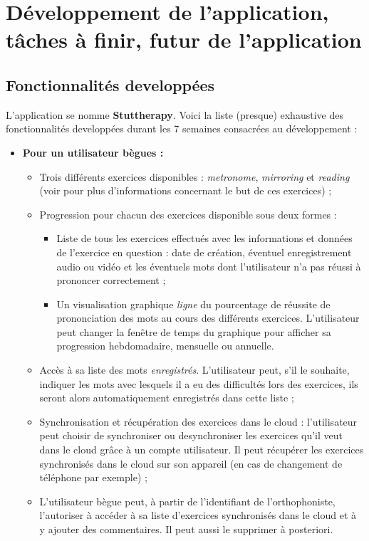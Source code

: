 \section{Développement de l'application, tâches à finir, futur de l'application}

\subsection{Fonctionnalités developpées}
L'application se nomme \textbf{Stuttherapy}. Voici la liste (presque) exhaustive des fonctionnalités developpées durant les 7 semaines consacrées au développement :

\begin{itemize}

  \item \textbf{Pour un utilisateur bègues :}
  \begin{itemize}
    \item Trois différents exercices disponibles : \textit{metronome}, \textit{mirroring} et \textit{reading} (voir  pour plus d'informations concernant le but de ces exercices) ;
    \item Progression pour chacun des exercices disponible sous deux formes :
    \begin{itemize}
      \item Liste de tous les exercices effectués avec les informations et données de l'exercice en question : date de création, éventuel enregistrement audio ou vidéo et les éventuels mots dont l'utilisateur n'a pas réussi à prononcer correctement ;
      \item Un visualisation graphique \textit{ligne} du pourcentage de réussite de prononciation des mots au cours des différents exercices. L'utilisateur peut changer la fenêtre de temps du graphique pour afficher sa progression hebdomadaire, mensuelle ou annuelle.
    \end{itemize}
    \item Accès à sa liste des mots \textit{enregistrés}. L'utilisateur peut, s'il le souhaite, indiquer les mots avec lesquels il a eu des difficultés lors des exercices, ils seront alors automatiquement enregistrés dans cette liste ;
    \item Synchronisation et récupération des exercices dans le cloud : l'utilisateur peut choisir de synchroniser ou desynchroniser les exercices qu'il veut dans le cloud grâce à un compte utilisateur. Il peut récupérer les exercices synchronisés dans le cloud sur son appareil (en cas de changement de téléphone par exemple) ;
    \item L'utilisateur bègue peut, à partir de l'identifiant de l'orthophoniste, l'autoriser à accéder à sa liste d'exercices synchronisés dans le cloud et à y ajouter des commentaires. Il peut aussi le supprimer à posteriori.
  \end{itemize}


\end{itemize}

